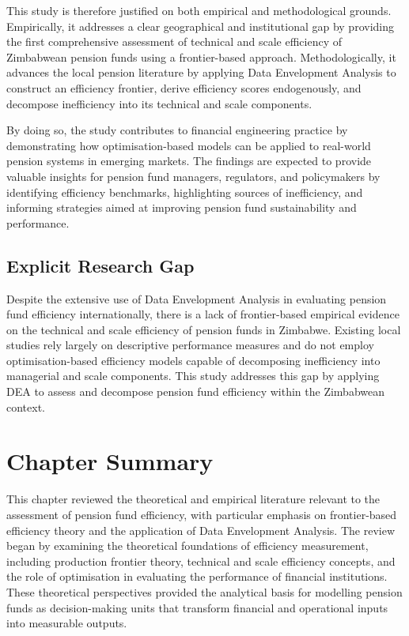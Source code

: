 \documentclass[12pt,a4paper]{article}
\begin{document}
This study is therefore justified on both empirical and methodological grounds. Empirically, it addresses a clear geographical and institutional gap by providing the first comprehensive assessment of technical and scale efficiency of Zimbabwean pension funds using a frontier-based approach. Methodologically, it advances the local pension literature by applying Data Envelopment Analysis to construct an efficiency frontier, derive efficiency scores endogenously, and decompose inefficiency into its technical and scale components.

By doing so, the study contributes to financial engineering practice by demonstrating how optimisation-based models can be applied to real-world pension systems in emerging markets. The findings are expected to provide valuable insights for pension fund managers, regulators, and policymakers by identifying efficiency benchmarks, highlighting sources of inefficiency, and informing strategies aimed at improving pension fund sustainability and performance.

\subsection{Explicit Research Gap}

Despite the extensive use of Data Envelopment Analysis in evaluating pension fund efficiency internationally, there is a lack of frontier-based empirical evidence on the technical and scale efficiency of pension funds in Zimbabwe. Existing local studies rely largely on descriptive performance measures and do not employ optimisation-based efficiency models capable of decomposing inefficiency into managerial and scale components. This study addresses this gap by applying DEA to assess and decompose pension fund efficiency within the Zimbabwean context.

\section{Chapter Summary}

This chapter reviewed the theoretical and empirical literature relevant to the assessment of pension fund efficiency, with particular emphasis on frontier-based efficiency theory and the application of Data Envelopment Analysis. The review began by examining the theoretical foundations of efficiency measurement, including production frontier theory, technical and scale efficiency concepts, and the role of optimisation in evaluating the performance of financial institutions. These theoretical perspectives provided the analytical basis for modelling pension funds as decision-making units that transform financial and operational inputs into measurable outputs.
\end{document}
